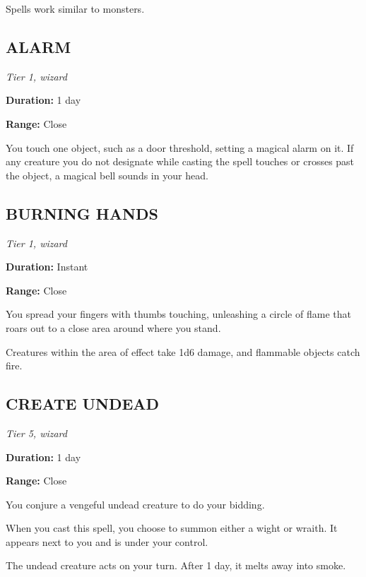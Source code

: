 \documentclass[
  10pt,
  titlepage=firstiscover,
  toc=flat,
  twoside]{scrreprt}
\begin{document}
{\begin{multicols*}{2}

Spells work similar to monsters.

\subsection{ALARM}\label{alarm}

\emph{Tier 1, wizard}

\textbf{Duration: }1 day

\textbf{Range: }Close

You touch one object, such as a door threshold, setting a magical alarm
on it. If any creature you do not designate while casting the spell
touches or crosses past the object, a magical bell sounds in your head.

\subsection{BURNING HANDS}\label{burning-hands}

\emph{Tier 1, wizard}

\textbf{Duration: }Instant

\textbf{Range: }Close

You spread your fingers with thumbs touching, unleashing a circle of
flame that roars out to a close area around where you stand.

Creatures within the area of effect take 1d6 damage, and flammable
objects catch fire.

\subsection{CREATE UNDEAD}\label{create-undead}

\emph{Tier 5, wizard}

\textbf{Duration: }1 day

\textbf{Range: }Close

You conjure a vengeful undead creature to do your bidding.

When you cast this spell, you choose to summon either a wight or wraith.
It appears next to you and is under your control.

The undead creature acts on your turn. After 1 day, it melts away into
smoke.


\end{multicols*}}
\end{document}

